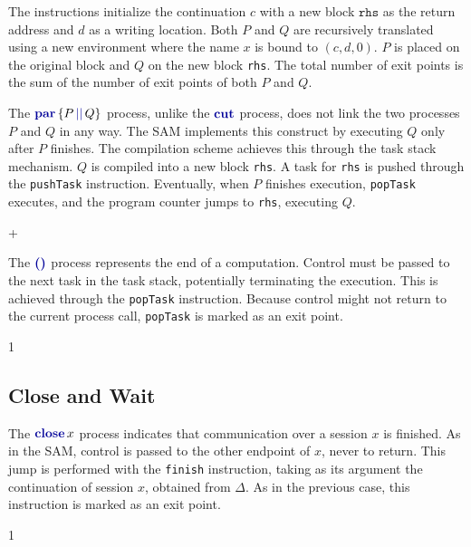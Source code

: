 The instructions initialize the continuation $c$ with a new block $\texttt{rhs}$ as the return address and $d$ as a writing location. Both $P$ and $Q$ are recursively translated using a new environment where the name $x$ is bound to $(c, d, 0)$. $P$ is placed on the original block and $Q$ on the new block \texttt{rhs}. The total number of exit points is the sum of the number of exit points of both $P$ and $Q$. 

The $\parc{P}{Q}$ process, unlike the $\cutp$ process, does not link the two processes $P$ and $Q$ in any way. The \ac{SAM} implements this construct by executing $Q$ only after $P$ finishes. The compilation scheme achieves this through the task stack mechanism. $Q$ is compiled into a new block \texttt{rhs}. A task for \texttt{rhs} is pushed through the \texttt{pushTask} instruction. Eventually, when $P$ finishes execution, \texttt{popTask} executes, and the program counter jumps to \texttt{rhs}, executing $Q$.
\begin{compilation}{\theta}{\Delta}{}
{ + }
     
\end{compilation}

The $\emptyp$ process represents the end of a computation. Control must be passed to the next task in the task stack, potentially terminating the execution. This is achieved through the \texttt{popTask} instruction. Because control might not return to the current process call, \texttt{popTask} is marked as an exit point.
\begin{compilation}{\theta}{\Delta}{\emptyc}{1}
    \poptask{\hasexitpoint}
\end{compilation}

\subsection{Close and Wait}

The $\closec{x}$ process indicates that communication over a session $x$ is finished. As in the \ac{SAM}, control is passed to the other endpoint of $x$, never to return. This jump is performed with the \texttt{finish} instruction, taking as its argument the continuation of session $x$, obtained from $\Delta$. As in the previous case, this instruction is marked as an exit point.
\begin{compilation}{\theta}{\Delta}{}{1}
\end{compilation}

